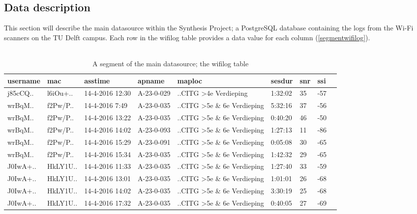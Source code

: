\subsection{Data description}\label{datadescription}
This section will describe the main datasource within the Synthesis Project; a PostgreSQL database containing the logs from the Wi-Fi scanners on the TU Delft campus. Each row in the wifilog table provides a data value for each column (\autoref{segmentwifilog}).\\\\
\begin{table}[H]
	\centering
	\captionsetup{justification=centering}
	\caption{A segment of the main datasource; the wifilog table}
	\label{segmentwifilog}
	\begin{tabular}{@{}lllllllll@{}}
		\toprule
		\textbf{username} & \textbf{mac} & \textbf{asstime} & \textbf{apname}  & \textbf{maploc}                                                     & \textbf{sesdur} & \textbf{snr} & \textbf{ssi}          \\ \midrule
		j85cCQ..      & l6iOu+.. & 14-4-2016 12:30  & A-23-0-029 & ..CITG \textgreater 4e Verdieping       & 1:32:02         & 35           & -57\\
		wrBqM..       & f2Pw/P.. & 14-4-2016 7:49   & A-23-0-035 & ..CITG \textgreater 5e \& 6e Verdieping & 5:32:16         & 37           & -56\\
		wrBqM..       & f2Pw/P.. & 14-4-2016 13:22  & A-23-0-035 & ..CITG \textgreater 5e \& 6e Verdieping & 0:40:20         & 46           & -50\\
		wrBqM..       & f2Pw/P.. & 14-4-2016 14:02  & A-23-0-093 & ..CITG \textgreater 5e \& 6e Verdieping & 1:27:13         & 11           & -86\\
		wrBqM..       & f2Pw/P.. & 14-4-2016 15:29  & A-23-0-091 & ..CITG \textgreater 5e \& 6e Verdieping & 0:05:08         & 30           & -65\\
		wrBqM..       & f2Pw/P.. & 14-4-2016 15:34  & A-23-0-035 & ..CITG \textgreater 5e \& 6e Verdieping & 1:42:32         & 29           & -65\\
		J0IwA+..      & HkLY1U.. & 14-4-2016 11:33  & A-23-0-035 & ..CITG \textgreater 5e \& 6e Verdieping & 1:27:40         & 33           & -59\\
		J0IwA+..      & HkLY1U.. & 14-4-2016 13:01  & A-23-0-035 & ..CITG \textgreater 5e \& 6e Verdieping & 1:01:01         & 26           & -68\\
		J0IwA+..      & HkLY1U.. & 14-4-2016 14:02  & A-23-0-035 & ..CITG \textgreater 5e \& 6e Verdieping & 3:30:19         & 25           & -68\\
		J0IwA+..      & HkLY1U.. & 14-4-2016 17:32  & A-23-0-035 & ..CITG \textgreater 5e \& 6e Verdieping & 0:40:05         & 27           & -69\\ \bottomrule
	\end{tabular}
\end{table}
